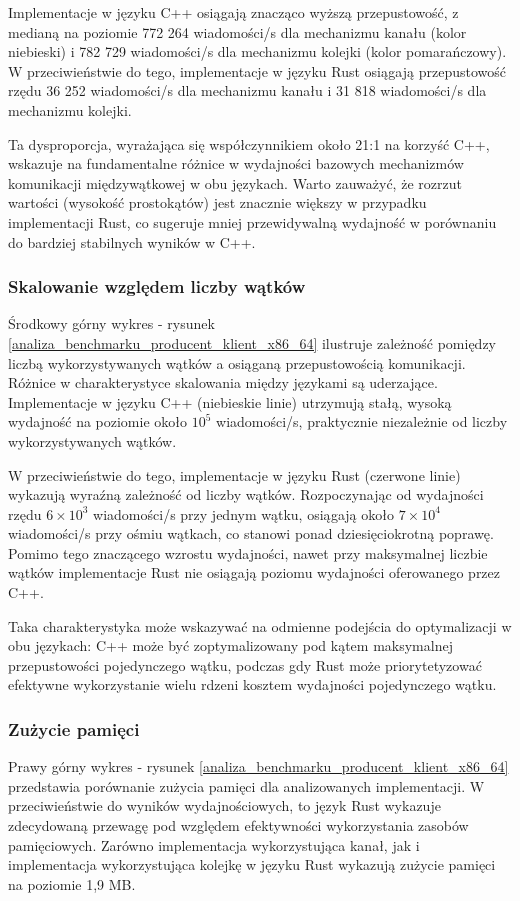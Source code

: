 Implementacje w języku C++ osiągają znacząco wyższą przepustowość, z medianą na poziomie 772 264 wiadomości/s dla mechanizmu kanału (kolor niebieski) i 782 729 wiadomości/s dla mechanizmu kolejki (kolor pomarańczowy). W przeciwieństwie do tego, implementacje w języku Rust osiągają przepustowość rzędu 36 252 wiadomości/s dla mechanizmu kanału i 31 818 wiadomości/s dla mechanizmu kolejki.

Ta dysproporcja, wyrażająca się współczynnikiem około 21:1 na korzyść C++, wskazuje na fundamentalne różnice w wydajności bazowych mechanizmów komunikacji międzywątkowej w obu językach. Warto zauważyć, że rozrzut wartości (wysokość prostokątów) jest znacznie większy w przypadku implementacji Rust, co sugeruje mniej przewidywalną wydajność w porównaniu do bardziej stabilnych wyników w C++.

\subsubsection{Skalowanie względem liczby wątków}
Środkowy górny wykres - rysunek \ref{analiza_benchmarku_producent_klient_x86_64} ilustruje zależność pomiędzy liczbą wykorzystywanych wątków a osiąganą przepustowością komunikacji. Różnice w charakterystyce skalowania między językami są uderzające. Implementacje w języku C++ (niebieskie linie) utrzymują stałą, wysoką wydajność na poziomie około $10^5$ wiadomości/s, praktycznie niezależnie od liczby wykorzystywanych wątków.

W przeciwieństwie do tego, implementacje w języku Rust (czerwone linie) wykazują wyraźną zależność od liczby wątków. Rozpoczynając od wydajności rzędu $6\times10^3$ wiadomości/s przy jednym wątku, osiągają około $7\times10^4$ wiadomości/s przy ośmiu wątkach, co stanowi ponad dziesięciokrotną poprawę. Pomimo tego znaczącego wzrostu wydajności, nawet przy maksymalnej liczbie wątków implementacje Rust nie osiągają poziomu wydajności oferowanego przez C++.

Taka charakterystyka może wskazywać na odmienne podejścia do optymalizacji w obu językach: C++ może być zoptymalizowany pod kątem maksymalnej przepustowości pojedynczego wątku, podczas gdy Rust może priorytetyzować efektywne wykorzystanie wielu rdzeni kosztem wydajności pojedynczego wątku.


\subsubsection{Zużycie pamięci}
Prawy górny wykres - rysunek \ref{analiza_benchmarku_producent_klient_x86_64} przedstawia porównanie zużycia pamięci dla analizowanych implementacji. W przeciwieństwie do wyników wydajnościowych, to język Rust wykazuje zdecydowaną przewagę pod względem efektywności wykorzystania zasobów pamięciowych. Zarówno implementacja wykorzystująca kanał, jak i implementacja wykorzystująca kolejkę w języku Rust wykazują zużycie pamięci na poziomie 1,9 MB.

